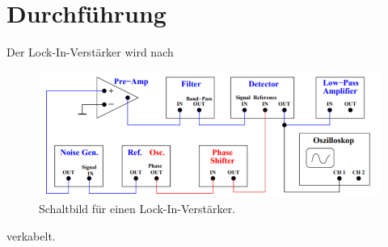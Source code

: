 \section{Durchführung}
\label{sec:Durchführung}


Der Lock-In-Verstärker wird nach 

\begin{figure}
    \centering
    \includegraphics[width=\textwidth/2]{images/bild3.png}
    \caption{Schaltbild für einen Lock-In-Verstärker.\cite{V303}}
    \label{fig:bild3}
\end{figure}

verkabelt.
